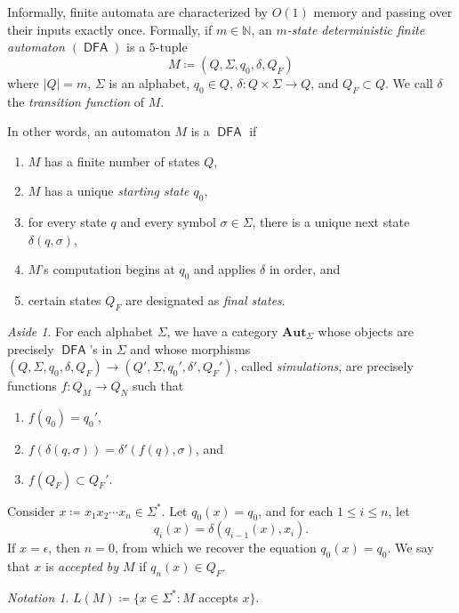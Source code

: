 \documentclass[10pt,letterpaper,cm]{nupset}
\theoremstyle{definition}
\theoremstyle{theorem}
\theoremstyle{remark}
\newtheorem*{aside}{Aside}
\newtheorem*{notation}{Notation}
\newcommand{\N}{\mathbb N}
\newcommand{\1}{\mathbf{1}}
\newcommand{\0}{\vec 0}
\DeclareMathOperator{\DFA}{\mathsf{DFA}}
\begin{document}
\bigskip

Informally, finite automata are characterized by $O(1)$ memory and passing over their inputs exactly once.
Formally, if $m \in \N$, an \textit{$m$-state deterministic finite automaton $(\DFA)$}  is a $5$-tuple 
\[ \label{eqn:auto}
M\coloneqq \left(Q, \Sigma, q_0, \delta, Q_F\right)  \tag{$\alpha$}
\] where  $\left\lvert{Q}\right\rvert = m$, $\Sigma$ is an alphabet, $q_0\in Q$, $\delta : Q\times \Sigma \to Q$, and $Q_F\subset Q$. We call $\delta$ the \textit{transition function} of $M$.

In other words, an automaton $M$ is a $\DFA$ if
\begin{enumerate}[label=(\alph*)]
\item $M$ has a finite number of states $Q$,
\item $M$ has a unique \textit{starting state $q_0$},
\item for every state $q$ and every symbol $\sigma \in \Sigma$, there is a unique next state $\delta(q, \sigma)$,
\item $M$'s computation begins at $q_0$ and applies $\delta$ in order, and
\item certain states $Q_F$ are designated as \textit{final states}.
\end{enumerate}

\begin{aside}
For each alphabet $\Sigma$, we have a category $\mathbf{Aut}_{\Sigma}$ whose objects are precisely $\DFA$'s in $\Sigma$ and  whose morphisms $ \left(Q, \Sigma, q_0, \delta, Q_F\right)  \to  \left(Q', \Sigma, q_0', \delta', Q_F'\right) $, called \textit{simulations}, are precisely functions $f: Q_M \to Q_N$ such that
\begin{enumerate}[label=(\roman*)]
\item $f(q_0) = q_0'$,
\item $f(\delta(q, \sigma)) = \delta'(f(q), \sigma)$, and
\item $f(Q_F) \subset Q_F'$.
\end{enumerate}
\end{aside}

\medskip

Consider $x\coloneqq x_1x_2\cdots x_n \in \Sigma^{\ast}$. Let $q_0(x) = q_0$, and for each $1\leq i\leq n$, let $$q_i(x) =\delta(q_{i-1}(x), x_i).$$ If $x= \epsilon$, then $n=0$, from which we recover the equation $q_0(x) = q_0$. We say that $x$ is \textit{accepted by $M$} if $q_n(x) \in Q_F$. 


\begin{notation}
$L(M) \coloneqq\{x\in \Sigma^{\ast} : M$ accepts $x\}$.
\end{notation}
\end{document}
